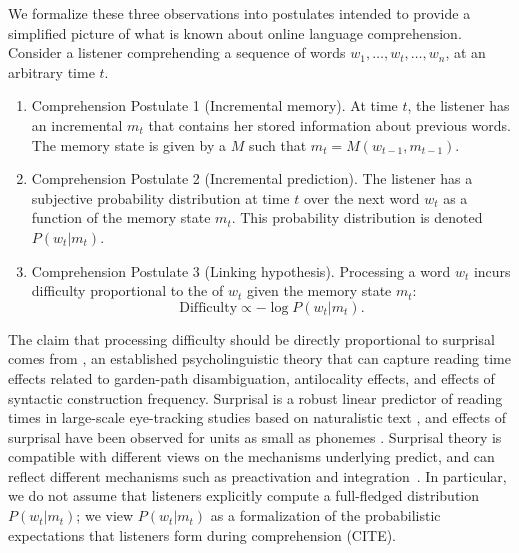 We formalize these three observations into postulates intended to provide a simplified picture of what is known about online language comprehension. Consider a listener comprehending a sequence of words $w_1, \dots, w_t, \dots, w_n$, at an arbitrary time $t$.
\begin{enumerate}
    \item Comprehension Postulate 1 (Incremental memory). At time $t$, the listener has an incremental  $m_t$ that contains her stored information about previous words. The memory state is given by a  $M$ such that $m_t = M(w_{t-1}, m_{t-1})$.
    \item Comprehension Postulate 2 (Incremental prediction). The listener has a subjective probability distribution at time $t$ over the next word $w_t$ as a function of the memory state $m_t$. This probability distribution is denoted $P(w_t|m_t)$.
    \item Comprehension Postulate 3 (Linking hypothesis). Processing a word $w_t$ incurs difficulty proportional to the  of $w_t$ given the memory state $m_t$:
    \begin{equation}
    \label{eq:lossy-surp}
    \text{Difficulty} \propto -\log P(w_t | m_t).
\end{equation}
\end{enumerate}
The claim that processing difficulty should be directly proportional to surprisal comes from  \citep{hale2001probabilistic,levy2008expectation}, an established psycholinguistic theory that can capture reading time effects related to garden-path disambiguation, antilocality effects, and effects of syntactic construction frequency. Surprisal is a robust linear predictor of reading times in large-scale eye-tracking studies based on naturalistic text \citep{smith-effect-2013,goodkind-predictive-2018}, and effects of surprisal have been observed for units as small as phonemes \citep{}.
Surprisal theory is compatible with different views on the mechanisms underlying predict, and can reflect different mechanisms such as preactivation and integration~\citep{kuperberg2016we}.
In particular, we do not assume that listeners explicitly compute a full-fledged distribution $P(w_t|m_t)$; we view $P(w_t|m_t)$ as a formalization of the probabilistic expectations that listeners form during comprehension (CITE).


